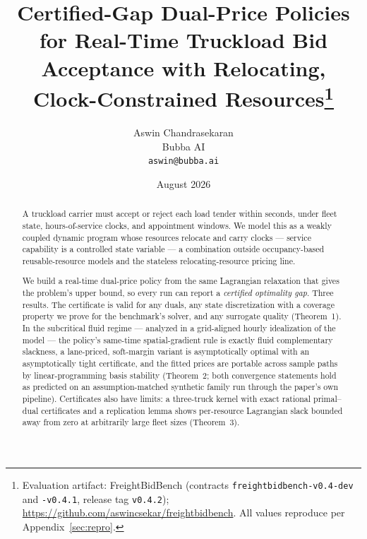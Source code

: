 \documentclass[11pt]{article}
\title{Certified-Gap Dual-Price Policies for Real-Time Truckload Bid
Acceptance with Relocating, Clock-Constrained
Resources\thanks{Evaluation artifact: FreightBidBench
(contracts \texttt{freightbidbench-v0.4-dev} and
\texttt{-v0.4.1}, release tag \texttt{v0.4.2});
\url{https://github.com/aswincsekar/freightbidbench}. All values
reproduce per Appendix~\ref{sec:repro}.}}
\author{Aswin Chandrasekaran \\ Bubba AI \\ \texttt{aswin@bubba.ai}}
\date{August 2026}
\begin{document}
\maketitle

\begin{abstract}
A truckload carrier must accept or reject each load tender within
seconds, under fleet state, hours-of-service clocks, and appointment
windows. We model this as a weakly coupled dynamic program whose
resources relocate and carry clocks --- service capability is a
controlled state variable --- a combination outside occupancy-based
reusable-resource models and the stateless relocating-resource
pricing line.

We build a real-time dual-price policy from the same Lagrangian
relaxation that gives the problem's upper bound, so every run can
report a \emph{certified optimality gap}. Three results. The certificate is
valid for any duals, any state discretization with a coverage
property we prove for the benchmark's solver, and any surrogate
quality (Theorem~1). In the subcritical fluid regime --- analyzed in a
grid-aligned hourly idealization of the model --- the policy's same-time
spatial-gradient rule is exactly fluid complementary slackness, a
lane-priced, soft-margin variant is asymptotically optimal with an
asymptotically tight certificate, and the fitted prices are portable
across sample paths by linear-programming basis stability (Theorem~2;
both convergence statements hold as predicted on an
assumption-matched synthetic family run through the paper's own
pipeline).
Certificates also have limits: a three-truck kernel with exact
rational primal--dual certificates and a replication lemma shows
per-resource Lagrangian slack bounded away from zero at arbitrarily
large fleet sizes (Theorem~3).


\end{abstract}
\end{document}
